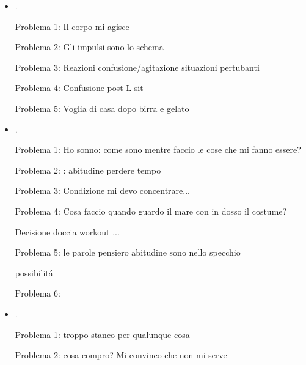 \begin{itemize}
Problema 1: Divento sonno

Problema 2: Cercare le cose di cui ho bisogno a caso

Problema 3: loquor stato d'animo incontri

Problema 4: decisione determinata dal 

Problema 5: Condizione latte-sollevamento bike-sole

Problema 6: Seguire impulsi 

Problema 7: Quando faccio lo schema??

Problema 8: 

Problema 9: : se prendo il gelato al ritorno passa da Nice per il pub.


\item {}.

Problema 1: Il corpo mi agisce

Problema 2: Gli impulsi sono lo schema

Problema 3: Reazioni confusione/agitazione situazioni pertubanti

Problema 4: Confusione post L-sit

Problema 5: Voglia di casa dopo birra e gelato

\item {}.

Problema 1: Ho sonno: come sono mentre faccio le cose che mi fanno essere?

Problema 2: : abitudine perdere tempo

Problema 3: Condizione mi devo concentrare...

Problema 4: Cosa faccio quando guardo il mare con in dosso il costume?

Decisione doccia workout ...

Problema 5: le parole pensiero abitudine sono nello specchio

possibilit\'a

Problema 6: 

\item {}.

Problema 1: troppo stanco per qualunque cosa

Problema 2: cosa compro? Mi convinco che non mi serve


\end{itemize}
